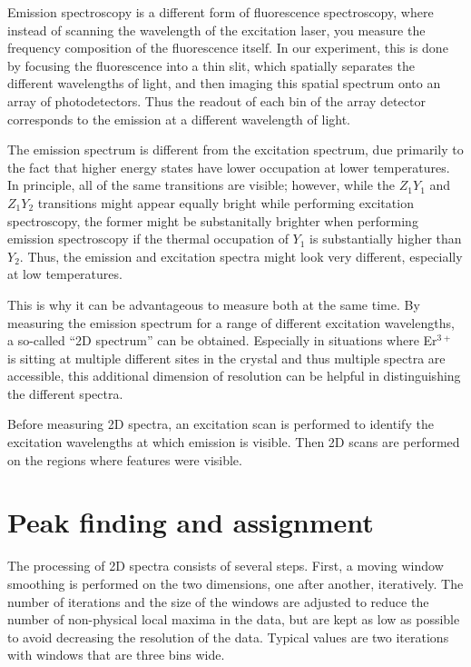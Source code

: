 \documentclass[12pt]{puthesis}
\newcommand{\erbium}[1][ ]{Er$^{3+}$#1}
\begin{document}
Emission spectroscopy is a different form of fluorescence spectroscopy, where instead of scanning the wavelength of the excitation laser, you measure the frequency composition of the fluorescence itself. In our experiment, this is done by focusing the fluorescence into a thin slit, which spatially separates the different wavelengths of light, and then imaging this spatial spectrum onto an array of photodetectors. Thus the readout of each bin of the array detector corresponds to the emission at a different wavelength of light.

The emission spectrum is different from the excitation spectrum, due primarily to the fact that higher energy states have lower occupation at lower temperatures. In principle, all of the same transitions are visible; however, while the $Z_{1}Y_{1}$ and $Z_{1}Y_{2}$ transitions might appear equally bright while performing excitation spectroscopy, the former might be substanitally brighter when performing emission spectroscopy if the thermal occupation of $Y_{1}$ is substantially higher than $Y_{2}$. Thus, the emission and excitation spectra might look very different, especially at low temperatures.

This is why it can be advantageous to measure both at the same time. By measuring the emission spectrum for a range of different excitation wavelengths, a so-called ``2D spectrum'' can be obtained. Especially in situations where \erbium is sitting at multiple different sites in the crystal and thus multiple spectra are accessible, this additional dimension of resolution can be helpful in distinguishing the different spectra.

Before measuring 2D spectra, an excitation scan is performed to identify the excitation wavelengths at which emission is visible. Then 2D scans are performed on the regions where features were visible. 

\section{Peak finding and assignment}
\label{sec:peak-find-assignm}

The processing of 2D spectra consists of several steps. First, a moving window smoothing is performed on the two dimensions, one after another, iteratively. The number of iterations and the size of the windows are adjusted to reduce the number of non-physical local maxima in the data, but are kept as low as possible to avoid decreasing the resolution of the data. Typical values are two iterations with windows that are three bins wide.
\end{document}
